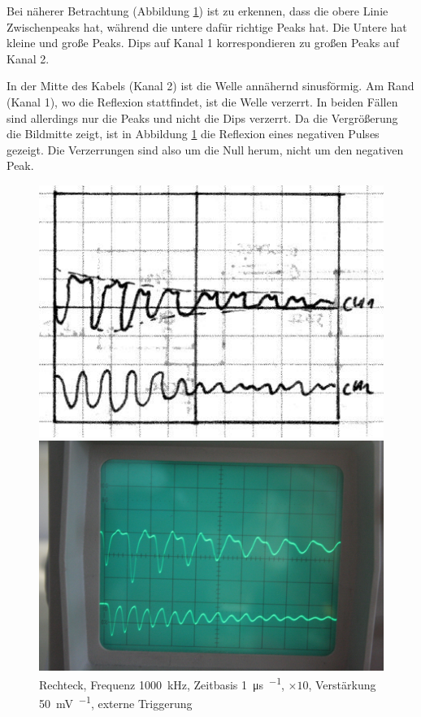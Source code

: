 Bei näherer Betrachtung (Abbildung \ref{fig:0759}) ist zu erkennen, dass die
obere Linie Zwischenpeaks hat, während die untere dafür richtige Peaks hat. Die
Untere hat kleine und große Peaks. Dips auf Kanal 1 korrespondieren zu großen
Peaks auf Kanal 2.

In der Mitte des Kabels (Kanal 2) ist die Welle annähernd sinusförmig. Am Rand (Kanal 1), wo die Reflexion stattfindet, ist die Welle verzerrt. In beiden Fällen sind allerdings nur die Peaks und nicht die Dips verzerrt. Da die Vergrößerung die Bildmitte zeigt, ist in Abbildung \ref{fig:0759} die Reflexion eines negativen Pulses gezeigt. Die Verzerrungen sind also um die Null herum, nicht um den negativen Peak.

\begin{figure}[htbp]
	\centering
	\begin{minipage}{.45\linewidth}
	\includegraphics[width=\linewidth]{Skizzen/IMG_0759-1500.jpg}
	\end{minipage}
	\hfill
	\begin{minipage}{.45\linewidth}
	\includegraphics[width=\linewidth]{Fotos/IMG_0759-1500.jpg}
	\end{minipage}
	\caption{%
		Rechteck, Frequenz \SI{1000}{\kilo\hertz},
		Zeitbasis \SI{1}{\micro\second\per\division},
		$\times 10$,
		Verstärkung \SI{50}{\milli\volt\per\division},
		externe Triggerung
	}
	\label{fig:0759}
\end{figure}

